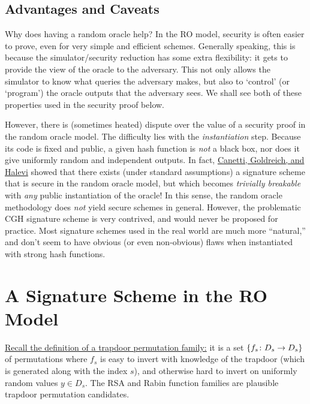 \documentclass[11pt]{article}
\begin{document}
\subsection{Advantages and Caveats}
\label{sec:advantages-caveats}

Why does having a random oracle help?  In the RO model, security is
often easier to prove, even for very simple and efficient schemes.
Generally speaking, this is because the simulator/security reduction
has some extra flexibility: it gets to provide the view of the oracle
to the adversary.  This not only allows the simulator to know what
queries the adversary makes, but also to `control' (or `program') the
oracle outputs that the adversary sees.  We shall see both of these
properties used in the security proof below.

However, there is (sometimes heated) dispute over the value of a
security proof in the random oracle model.  The difficulty lies with
the \emph{instantiation} step.  Because its code is fixed and public,
a given hash function is \emph{not} a black box, nor does it give
uniformly random and independent outputs.  In fact,
\href{http://arxiv.org/abs/cs.CR/0010019}{Canetti, Goldreich, and
  Halevi} showed that there exists (under standard assumptions) a
signature scheme that is secure in the random oracle model, but which
becomes \emph{trivially breakable} with \emph{any} public
instantiation of the oracle!  In this sense, the random oracle
methodology does \emph{not} yield secure schemes in general.  However,
the problematic CGH signature scheme is very contrived, and would
never be proposed for practice.  Most signature schemes used in the
real world are much more ``natural,'' and don't seem to have obvious
(or even non-obvious) flaws when instantiated with strong hash
functions.

\section{A Signature Scheme in the RO Model}
\label{sec:signature-scheme-ro}

\href{https://wiki.cc.gatech.edu/theory/images/7/75/Lec10.pdf}{Recall
  the definition of a trapdoor permutation family:} it is a set
$\{f_{s} \colon D_{s} \to D_{s}\}$ of permutations where $f_{s}$ is
easy to invert with knowledge of the trapdoor (which is generated
along with the index $s$), and otherwise hard to invert on uniformly
random values $y \in D_{s}$.  The RSA and Rabin function families are
plausible trapdoor permutation candidates.
\end{document}
